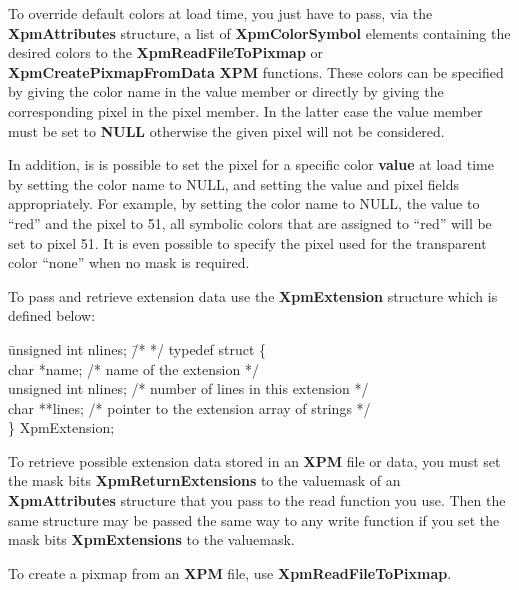 To override default colors at load time, you just have to pass, via the {\bf
XpmAttributes} structure, a list of {\bf XpmColorSymbol} elements containing
the desired colors to the {\bf XpmReadFileToPixmap} or {\bf
XpmCreatePixmapFromData} {\bf XPM} functions. These colors can be specified by
giving the color name in the value member or directly by giving the
corresponding pixel in the pixel member. In the latter case the value member
must be set to {\bf NULL} otherwise the given pixel will not be considered.

In addition, is is possible to set the pixel for a specific color {\bf value}
at load time by setting the color name to NULL, and setting the value and pixel
fields appropriately. For example, by setting the color name to NULL, the
value to ``red'' and the pixel to 51, all symbolic colors that are assigned to
``red'' will be set to pixel 51. It is even possible to specify the pixel used
for the transparent color ``none'' when no mask is required.

\vspace{.5cm}
To pass and retrieve extension data use the {\bf XpmExtension} structure which
is defined below:

\begin{tabbing}
\hspace{1cm}\= unsigned int nlines; \hspace{1cm}\= /*  */ \kill
typedef struct \{ \\
\> char *name;		\> /* name of the extension */ \\
\> unsigned int nlines;	\> /* number of lines in this extension */ \\
\> char **lines;	\> /* pointer to the extension array of strings */ \\
\}      XpmExtension;
\end{tabbing}

To retrieve possible extension data stored in an {\bf XPM} file or data, you
must set the mask bits {\bf XpmReturnExtensions} to the valuemask of an {\bf
XpmAttributes} structure that you pass to the read function you use. Then the
same structure may be passed the same way to any write function if you set the
mask bits {\bf XpmExtensions} to the valuemask.

\vspace{.5cm}
To create a pixmap from an {\bf XPM} file, use {\bf XpmReadFileToPixmap}.

